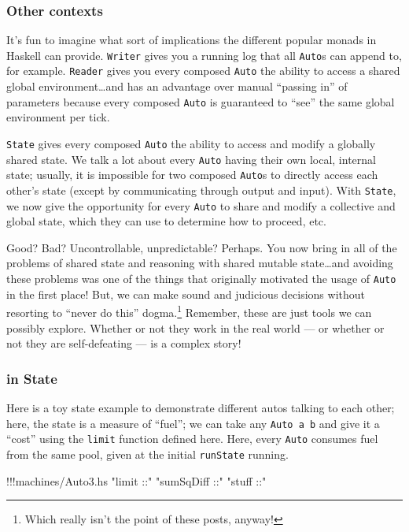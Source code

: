 \documentclass[]{article}
\newenvironment{Shaded}{}{}
\newcommand{\StringTok}[1]{\textcolor[rgb]{0.25,0.44,0.63}{{#1}}}
\newcommand{\FunctionTok}[1]{\textcolor[rgb]{0.02,0.16,0.49}{{#1}}}
\newcommand{\NormalTok}[1]{{#1}}
\begin{document}
\subsubsection{Other contexts}\label{other-contexts}

It's fun to imagine what sort of implications the different popular
monads in Haskell can provide. \texttt{Writer} gives you a running log
that all \texttt{Auto}s can append to, for example. \texttt{Reader}
gives you every composed \texttt{Auto} the ability to access a shared
global environment\ldots{}and has an advantage over manual ``passing
in'' of parameters because every composed \texttt{Auto} is guaranteed to
``see'' the same global environment per tick.

\texttt{State} gives every composed \texttt{Auto} the ability to access
and modify a globally shared state. We talk a lot about every
\texttt{Auto} having their own local, internal state; usually, it is
impossible for two composed \texttt{Auto}s to directly access each
other's state (except by communicating through output and input). With
\texttt{State}, we now give the opportunity for every \texttt{Auto} to
share and modify a collective and global state, which they can use to
determine how to proceed, etc.

Good? Bad? Uncontrollable, unpredictable? Perhaps. You now bring in all
of the problems of shared state and reasoning with shared mutable
state\ldots{}and avoiding these problems was one of the things that
originally motivated the usage of \texttt{Auto} in the first place! But,
we can make sound and judicious decisions without resorting to ``never
do this'' dogma.\footnote{Which really isn't the point of these posts,
  anyway!} Remember, these are just tools we can possibly explore.
Whether or not they work in the real world --- or whether or not they
are self-defeating --- is a complex story!

\subsubsection{in State}\label{in-state}

Here is a toy state example to demonstrate different autos talking to
each other; here, the state is a measure of ``fuel''; we can take any
\texttt{Auto\ a\ b} and give it a ``cost'' using the \texttt{limit}
function defined here. Here, every \texttt{Auto} consumes fuel from the
same pool, given at the initial \texttt{runState} running.

\begin{Shaded}
\begin{Highlighting}[]
\FunctionTok{!!!}\NormalTok{machines}\FunctionTok{/}\NormalTok{Auto3.hs }\StringTok{"limit ::"} \StringTok{"sumSqDiff ::"} \StringTok{"stuff ::"}
\end{Highlighting}
\end{Shaded}
\end{document}

